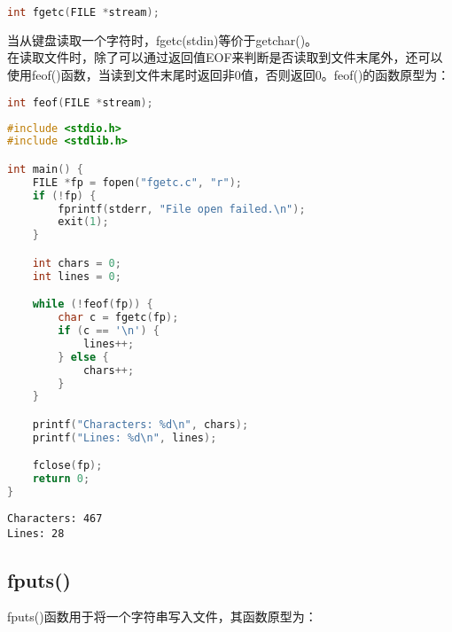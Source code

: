 \vspace{-0.5cm}

\begin{lstlisting}[language=C]
int fgetc(FILE *stream);
\end{lstlisting}

当从键盘读取一个字符时，fgetc(stdin)等价于getchar()。\\

在读取文件时，除了可以通过返回值EOF来判断是否读取到文件末尾外，还可以使用feof()函数，当读到文件末尾时返回非0值，否则返回0。feof()的函数原型为：

\vspace{-0.5cm}

\begin{lstlisting}[language=C]
int feof(FILE *stream);
\end{lstlisting}

\vspace{0.5cm}


\begin{lstlisting}[language=C]
#include <stdio.h>
#include <stdlib.h>

int main() {
    FILE *fp = fopen("fgetc.c", "r");
    if (!fp) {
        fprintf(stderr, "File open failed.\n");
        exit(1);
    }

    int chars = 0;
    int lines = 0;

    while (!feof(fp)) {
        char c = fgetc(fp);
        if (c == '\n') {
            lines++;
        } else {
            chars++;
        }
    }

    printf("Characters: %d\n", chars);
    printf("Lines: %d\n", lines);

    fclose(fp);
    return 0;
}
\end{lstlisting}

\begin{tcolorbox}
    \begin{verbatim}
Characters: 467
Lines: 28
	\end{verbatim}
\end{tcolorbox}

\vspace{0.5cm}

\subsection{fputs()}

fputs()函数用于将一个字符串写入文件，其函数原型为：

